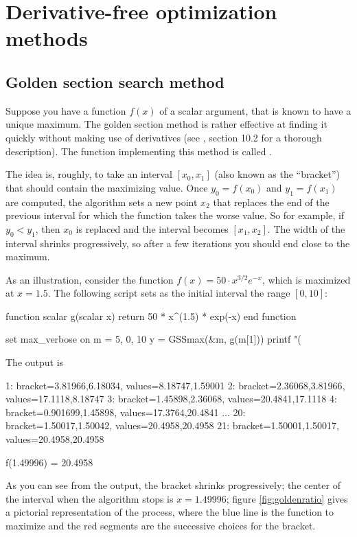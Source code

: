 \section{Derivative-free optimization methods}
\label{sec:derivfree}

\subsection{Golden section search method}
\label{sec:golden}

Suppose you have a function $f(x)$ of a scalar argument, that is known
to have a unique maximum. The golden section method is rather effective
at finding it quickly without making use of derivatives (see
\cite{pressetal2007}, section 10.2 for a thorough description). The
 function implementing this method is called .

The idea is, roughly, to take an interval $[x_0, x_1]$ (also known as
the ``bracket'') that should contain the maximizing value. Once
$y_0 = f(x_0)$ and $y_1 = f(x_1)$ are computed, the algorithm sets a
new point $x_2$ that replaces the end of the previous interval for
which the function takes the worse value. So for example, if
$y_0 < y_1$, then $x_0$ is replaced and the interval becomes
$[x_1, x_2]$. The width of the interval shrinks progressively, so
after a few iterations you should end close to the maximum.

As an illustration, consider the function $f(x) = 50 \cdot x^{3/2}
e^{-x}$, which is maximized at $x = 1.5$. The following script sets as
the initial interval the range $[0, 10]$:
\begin{scode}
function scalar g(scalar x)
    return 50 * x^(1.5) * exp(-x)
end function

set max_verbose on
m = {5, 0, 10}
y = GSSmax(&m, g(m[1]))
printf "\nf(%
\end{scode}

The output is
\begin{code}
1: bracket={3.81966,6.18034}, values={8.18747,1.59001}
2: bracket={2.36068,3.81966}, values={17.1118,8.18747}
3: bracket={1.45898,2.36068}, values={20.4841,17.1118}
4: bracket={0.901699,1.45898}, values={17.3764,20.4841}
...
20: bracket={1.50017,1.50042}, values={20.4958,20.4958}
21: bracket={1.50001,1.50017}, values={20.4958,20.4958}

f(1.49996) = 20.4958
\end{code}

As you can see from the output, the bracket shrinks progressively; the
center of the interval when the algorithm stops is $x=1.49996$;
figure \ref{fig:goldenratio} gives a pictorial representation of the
process, where the blue line is the function to maximize and the red
segments are the successive choices for the bracket.

